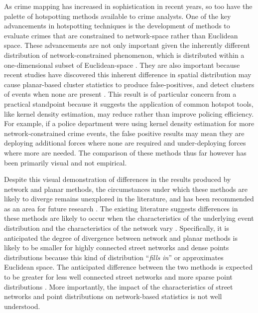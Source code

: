 \documentclass[12pt, letterpaper]{article}
\begin{document}
As crime mapping has increased in sophistication in recent years, so too have the palette of hotspotting methods available to crime analysts. One of the key advancements in hotspotting techniques is the development of methods to evaluate crimes that are constrained to network-space rather than Euclidean space. These advancements are not only important given the inherently different distribution of network-constrained phenomenon, which is distributed within a one-dimensional subset of Euclidean-space \citep{yamada2004comparison, borruso2008network}. They are also important because recent studies have discovered this inherent difference in spatial distribution may cause planar-based cluster statistics to produce false-positives, and detect clusters of events when none are present \citep{yamada2004comparison, luchen2007false, xie2008kernel}. This result is of particular concern from a practical standpoint because it suggests the application of common hotspot tools, like kernel density estimation, may reduce rather than improve policing efficiency. For example, if a police department were using kernel density estimation for more network-constrained crime events, the false positive results may mean they are deploying additional forces where none are required and under-deploying forces where more are needed. The comparison of these methods thus far however has been primarily visual and not empirical. 

Despite this visual demonstration of differences in the results produced by network and planar methods, the circumstances under which these methods are likely to diverge remains unexplored in the literature, and has been recommended as an area for future research \citep{luchen2007false, borruso2008network}. The existing literature suggests differences in these methods are likely to occur when the characteristics of the underlying event distribution and the characteristics of the network vary \citep{yamada2004comparison}. Specifically, it is anticipated the degree of divergence between network and planar methods is likely to be smaller for highly connected street networks and dense points distributions \citep{luchen2007false}because this kind of distribution ``\emph{fills in}'' or approximates Euclidean space. The anticipated difference between the two methods is expected to be greater for less well connected street networks and more sparse point distributions  \citep{luchen2007false}. More importantly, the impact of the characteristics of street networks and point distributions on network-based statistics is not well understood.
\end{document}
